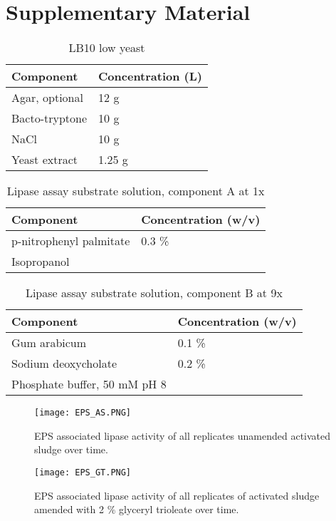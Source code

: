 \documentclass[twoside]{article}
\begin{document}
\section{Supplementary Material}
\thispagestyle{plain}
\begin{table}
\caption{LB10 low yeast}
\begin{tabular}{  p{6.9cm} | p{6.9cm} }
\hline
Component & Concentration (L) \\
\hline
 Agar, optional & 12 g  \\
Bacto-tryptone    & 10 g  \\
   NaCl   & 10 g  \\
    Yeast extract    & 1.25 g \\
  \hline
\end{tabular}
\end{table}


\begin{table}
\caption{Lipase assay substrate solution, component A at 1x}
\begin{tabular}{  p{6.9cm} | p{6.9cm} }
\hline
Component & Concentration (w/v) \\
\hline
 p-nitrophenyl palmitate   & 0.3 \% \\
 Isopropanol &  \\
 \hline
\end{tabular}
\end{table}

\begin{table}
\caption{Lipase assay substrate solution, component B at 9x}
\begin{tabular}{  p{6.9cm} | p{6.9cm} }
\hline
Component & Concentration (w/v) \\
\hline
 Gum arabicum & 0.1 \% \\
  Sodium deoxycholate & 0.2 \% \\
  Phosphate buffer, 50 mM pH 8   &  \\
  \hline
\end{tabular}
\end{table}

\begin{figure}
\texttt{[image: EPS\_AS.PNG]}
\caption{EPS associated lipase activity of all replicates unamended activated sludge over time.}
\end{figure}

\begin{figure}
\texttt{[image: EPS\_GT.PNG]}
\caption{EPS associated lipase activity of all replicates of activated sludge amended with 2 \% glyceryl trioleate over time.}
\end{figure}
\end{document}

